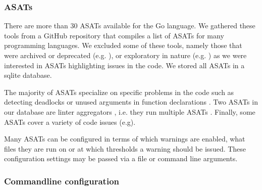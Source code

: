\documentclass{seal_article}
\begin{document}
\subsubsection{ASATs}
There are more than 30 ASATs available for the Go language. We gathered these tools from a GitHub repository \cite{awesome_asat} that compiles a list of ASATs for many programming languages. We excluded some of these tools, namely those that were archived or deprecated (e.g. \cite{interfacer}), or exploratory in nature (e.g. \cite{goroutine}) as we were interested in ASATs highlighting issues in the code. We stored all ASATs in a sqlite database.

The majority of ASATs specialize on specific problems in the code such as detecting deadlocks \cite{dingo-hunter} or unused arguments in function declarations \cite{nargs}. Two ASATs in our database are linter aggregators , i.e. they run multiple ASATs \cite{goreporter,golangci-lint}. Finally, some ASATs cover a variety of code issues (e.g\cite{staticcheck}). 

Many ASATs can be configured in terms of which warnings are enabled, what files they are run on or at which thresholds a warning should be issued. These configuration settings may be passed via a file or command line arguments.

\subsubsection{Commandline configuration}





\end{document}
